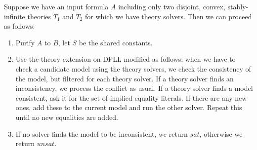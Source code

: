 \begin{mytitle} Suppose we have an input formula $A$ including only two disjoint, convex, stably-infinite theories $T_1$ and $T_2$ for which we have theory solvers. Then we can proceed as follows:
\begin{enumerate}
    \item Purify $A$ to $B$, let $S$ be the shared constants.
    \item Use the theory extension on DPLL modified as follows: when we have to check a candidate model using the theory solvers, we check the consistency of the model, but filtered for each theory solver. If a theory solver finds an inconsistency, we process the conflict as usual. If a theory solver finds a model consistent, ask it for the set of implied equality literals. If there are any new ones, add these to the current model and run the other solver. Repeat this until no new equalities are added.
    \item If no solver finds the model to be inconsistent, we return $sat$, otherwise we return $unsat$.
\end{enumerate}
\end{mytitle}